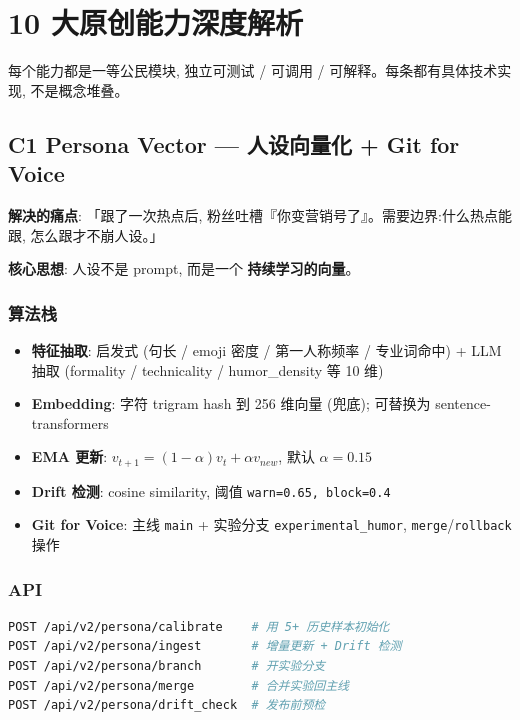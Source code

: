 \section{10 大原创能力深度解析}\label{sec:capabilities-10}

每个能力都是一等公民模块, 独立可测试 / 可调用 / 可解释。每条都有具体技术实现, 不是概念堆叠。

\subsection{C1 Persona Vector — 人设向量化 + Git for Voice}\label{sec:cap-persona}

\textbf{解决的痛点}: 「跟了一次热点后, 粉丝吐槽『你变营销号了』。需要边界:什么热点能跟, 怎么跟才不崩人设。」

\textbf{核心思想}: 人设不是 prompt, 而是一个 \textbf{持续学习的向量}。

\subsubsection{算法栈}

\begin{itemize}
    \item \textbf{特征抽取}: 启发式 (句长 / emoji 密度 / 第一人称频率 / 专业词命中) + LLM 抽取 (formality / technicality / humor\_density 等 10 维)
    \item \textbf{Embedding}: 字符 trigram hash 到 256 维向量 (兜底); 可替换为 sentence-transformers
    \item \textbf{EMA 更新}: $v_{t+1} = (1-\alpha) v_t + \alpha v_{new}$, 默认 $\alpha = 0.15$
    \item \textbf{Drift 检测}: cosine similarity, 阈值 \texttt{warn=0.65, block=0.4}
    \item \textbf{Git for Voice}: 主线 \texttt{main} + 实验分支 \texttt{experimental\_humor}, \texttt{merge}/\texttt{rollback} 操作
\end{itemize}

\subsubsection{API}

\begin{lstlisting}[language=bash]
POST /api/v2/persona/calibrate    # 用 5+ 历史样本初始化
POST /api/v2/persona/ingest       # 增量更新 + Drift 检测
POST /api/v2/persona/branch       # 开实验分支
POST /api/v2/persona/merge        # 合并实验回主线
POST /api/v2/persona/drift_check  # 发布前预检
\end{lstlisting}


